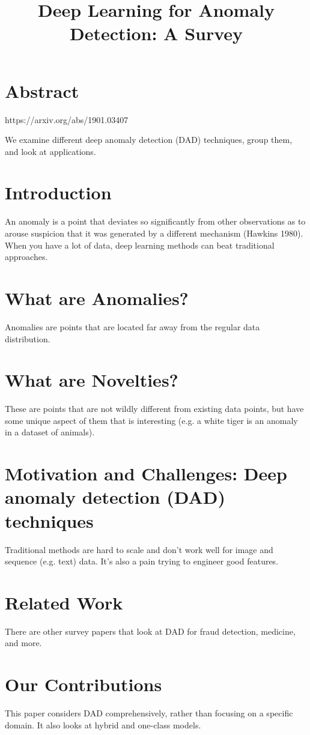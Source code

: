 \documentclass[a4paper]{article}
\title{Deep Learning for Anomaly Detection: A Survey}
\date{}
\begin{document}
\maketitle

\section{Abstract}
https://arxiv.org/abs/1901.03407

We examine different deep anomaly detection (DAD) techniques, group them,
and look at applications.

\section{Introduction}
An anomaly is a point that deviates so significantly
from other observations as to arouse suspicion that it was generated by a
different mechanism (Hawkins 1980). When you have a lot of data, deep learning
methods can beat traditional approaches.

\section{What are Anomalies?}
Anomalies are points that are located far away from the regular data
distribution.

\section{What are Novelties?}
These are points that are not wildly different from existing data points,
but have some unique aspect of them that is interesting (e.g. a white tiger is
an anomaly in a dataset of animals).

\section{Motivation and Challenges: Deep anomaly detection (DAD) techniques}
Traditional methods are hard to scale and don't work well for image and sequence
(e.g. text) data. It's also a pain trying to engineer good features.

\section{Related Work}
There are other survey papers that look at DAD for fraud detection, medicine,
and more.

\section{Our Contributions}
This paper considers DAD comprehensively, rather than focusing on a specific
domain. It also looks at hybrid and one-class models.
\end{document}

